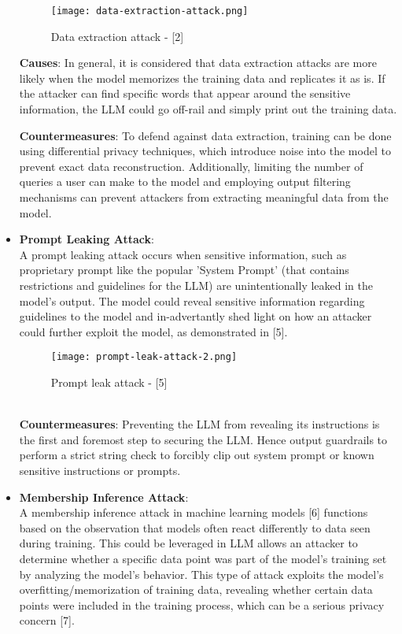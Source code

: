 \documentclass[12pt]{article}
\begin{document}
\begin{itemize}
        \begin{figure}[ht!]
            \centering
            \texttt{[image: data-extraction-attack.png]}
            \caption{Data extraction attack - [2]}
            \label{fig:data extraction attack}
        \end{figure}

        \textbf{Causes}: In general, it is considered that data extraction attacks are more likely when the model memorizes the training data and replicates it as is. If the attacker can find specific words that appear around the sensitive information, the LLM could go off-rail and simply print out the training data.

        \textbf{Countermeasures}: To defend against data extraction, training can be done using differential privacy techniques, which introduce noise into the model to prevent exact data reconstruction. Additionally, limiting the number of queries a user can make to the model and employing output filtering mechanisms can prevent attackers from extracting meaningful data from the model. \\

        \item \textbf{Prompt Leaking Attack}: \\
        A prompt leaking attack occurs when sensitive information, such as proprietary prompt like the popular 'System Prompt' (that contains restrictions and guidelines for the LLM) are unintentionally leaked in the model’s output. The model could reveal sensitive information regarding guidelines to the model and in-advertantly shed light on how an attacker could further exploit the model, as demonstrated in [5].
        \begin{figure}[h!]
            \centering
            \texttt{[image: prompt-leak-attack-2.png]}
            \caption{Prompt leak attack - [5]}
            \label{fig:enter-label}
        \end{figure} \\
        \textbf{Countermeasures}: Preventing the LLM from revealing its instructions is the first and foremost step to securing the LLM. Hence output guardrails to perform a strict string check to forcibly clip out system prompt or known sensitive instructions or prompts. \\


        \item \textbf{Membership Inference Attack}: \\
        A membership inference attack in machine learning models [6] functions based on the observation that models often react differently to data seen during training. This could be leveraged in LLM allows an attacker to determine whether a specific data point was part of the model’s training set by analyzing the model’s behavior. This type of attack exploits the model’s overfitting/memorization of training data, revealing whether certain data points were included in the training process, which can be a serious privacy concern [7].\\


\end{itemize}
\end{document}

